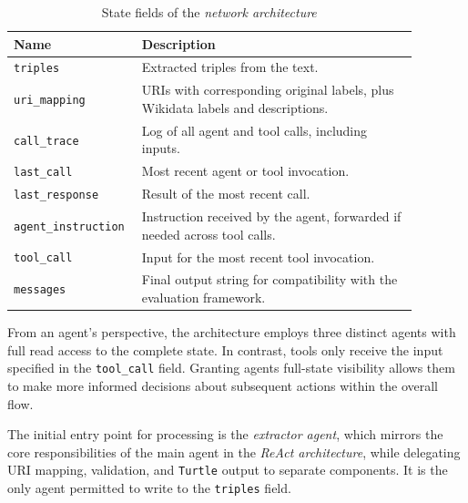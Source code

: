 \documentclass[a4paper,oneside,bibliography=totoc]{scrbook}
\begin{document}
\begin{table}[h!]
  \centering
  \caption{State fields of the \textit{network architecture}}
  \label{tab:network_state}
  \begin{tabular}{p{0.23\linewidth}p{0.65\linewidth}}
    \toprule
    \textbf{Name}               & \textbf{Description}                                                                 \\
    \midrule
    \texttt{triples}            & Extracted triples from the text.                                                     \\
    \texttt{uri\_mapping}       & \acp{URI} with corresponding original labels, plus Wikidata labels and descriptions. \\
    \texttt{call\_trace}        & Log of all agent and tool calls, including inputs.                                   \\
    \texttt{last\_call}         & Most recent agent or tool invocation.                                                \\
    \texttt{last\_response}     & Result of the most recent call.                                                      \\
    \texttt{agent\_instruction} & Instruction received by the agent, forwarded if needed across tool calls.            \\
    \texttt{tool\_call}         & Input for the most recent tool invocation.                                           \\
    \texttt{messages}           & Final output string for compatibility with the evaluation framework.                 \\
    \bottomrule
  \end{tabular}
\end{table}

From an agent's perspective, the architecture employs three distinct agents with full read access to the complete state. In contrast, tools only receive the input specified in the \texttt{tool\_call} field. Granting agents full-state visibility allows them to make more informed decisions about subsequent actions within the overall flow.

The initial entry point for processing is the \textit{extractor agent}, which mirrors the core responsibilities of the main agent in the \textit{\ac{ReAct} architecture}, while delegating \ac{URI} mapping, validation, and \texttt{Turtle} output to separate components. It is the only agent permitted to write to the \texttt{triples} field.
\end{document}
